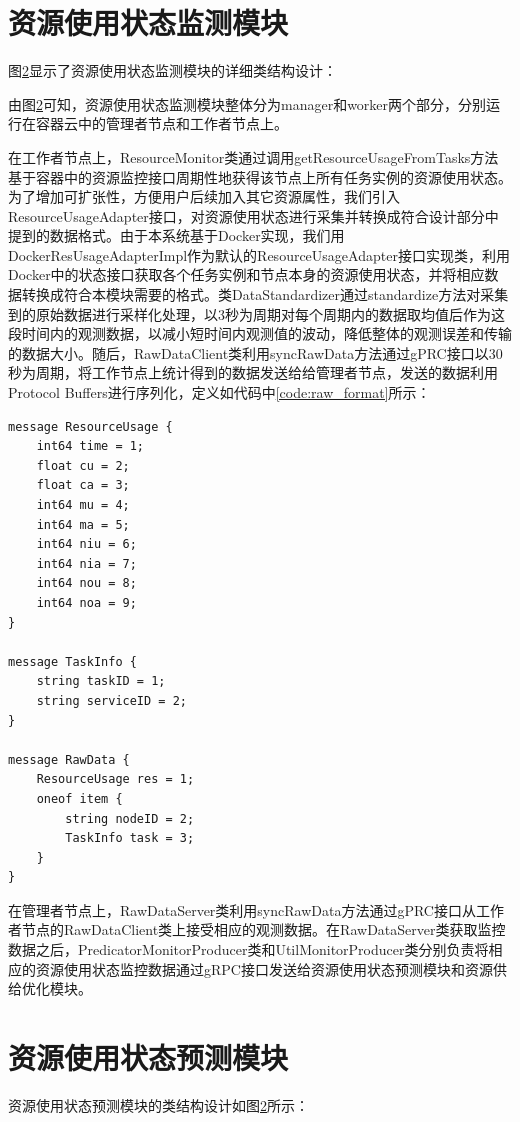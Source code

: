 \section{资源使用状态监测模块}
图\ref{}显示了资源使用状态监测模块的详细类结构设计：

由图\ref{}可知，资源使用状态监测模块整体分为manager和worker两个部分，分别运行在容器云中的管理者节点和工作者节点上。

在工作者节点上，ResourceMonitor类通过调用getResourceUsageFromTasks方法基于容器中的资源监控接口周期性地获得该节点上所有任务实例的资源使用状态。为了增加可扩张性，方便用户后续加入其它资源属性，我们引入ResourceUsageAdapter接口，对资源使用状态进行采集并转换成符合设计部分中提到的数据格式。由于本系统基于Docker实现，我们用DockerResUsageAdapterImpl作为默认的ResourceUsageAdapter接口实现类，利用Docker中的状态接口获取各个任务实例和节点本身的资源使用状态，并将相应数据转换成符合本模块需要的格式。类DataStandardizer通过standardize方法对采集到的原始数据进行采样化处理，以3秒为周期对每个周期内的数据取均值后作为这段时间内的观测数据，以减小短时间内观测值的波动，降低整体的观测误差和传输的数据大小。随后，RawDataClient类利用syncRawData方法通过gPRC接口以30秒为周期，将工作节点上统计得到的数据发送给给管理者节点，发送的数据利用Protocol Buffers进行序列化，定义如代码中\ref{code:raw_format}所示：
\begin{lstlisting}[language=protobuf3,style=protobuf, caption={资源使用状态监测数据},label={code:raw_format}]
message ResourceUsage {
    int64 time = 1;
    float cu = 2;
    float ca = 3;
    int64 mu = 4;
    int64 ma = 5;
    int64 niu = 6;
    int64 nia = 7;
    int64 nou = 8;
    int64 noa = 9;
}

message TaskInfo {
    string taskID = 1;
    string serviceID = 2;
}

message RawData {
    ResourceUsage res = 1;
    oneof item {
        string nodeID = 2;
        TaskInfo task = 3;
    }
}
\end{lstlisting}
在管理者节点上，RawDataServer类利用syncRawData方法通过gPRC接口从工作者节点的RawDataClient类上接受相应的观测数据。在RawDataServer类获取监控数据之后，PredicatorMonitorProducer类和UtilMonitorProducer类分别负责将相应的资源使用状态监控数据通过gRPC接口发送给资源使用状态预测模块和资源供给优化模块。

\section{资源使用状态预测模块}
资源使用状态预测模块的类结构设计如图\ref{}所示：

